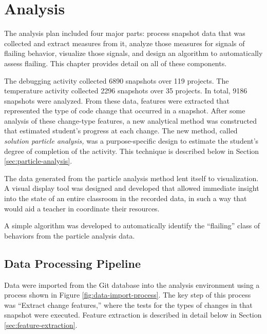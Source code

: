 \chapter{Analysis}
\label{chap:analysis}

The analysis plan included four major parts: process snapshot data that was collected and extract measures from it, analyze those measures for signals of flailing behavior, visualize those signals, and design an algorithm to automatically assess flailing. This chapter provides detail on all of these components.

The debugging activity collected 6890 snapshots over 119 projects. The temperature activity collected 2296 snapshots over 35 projects. In total, 9186 snapshots were analyzed. From these data, features were extracted that represented the type of code change that occurred in a snapshot. After some analysis of these change-type features, a new analytical method was constructed that estimated student's progress at each change. The new method, called \emph{solution particle analysis,} was a purpose-specific design to estimate the student's degree of completion of the activity. This technique is described below in Section \ref{sec:particle-analysis}. 

The data generated from the particle analysis method lent itself to visualization. A visual display tool was designed and developed that allowed immediate insight into the state of an entire classroom in the recorded data, in such a way that would aid a teacher in coordinate their resources.

A simple algorithm was developed to automatically identify the ``flailing'' class of behaviors from the particle analysis data.


\section{Data Processing Pipeline}
\label{sec:data-processing}

Data were imported from the Git database into the analysis environment using a process shown in Figure \ref{fig:data-import-process}. The key step of this process was ``Extract change features,'' where the tests for the types of changes in that snapshot were executed. Feature extraction is described in detail below in Section \ref{sec:feature-extraction}.

